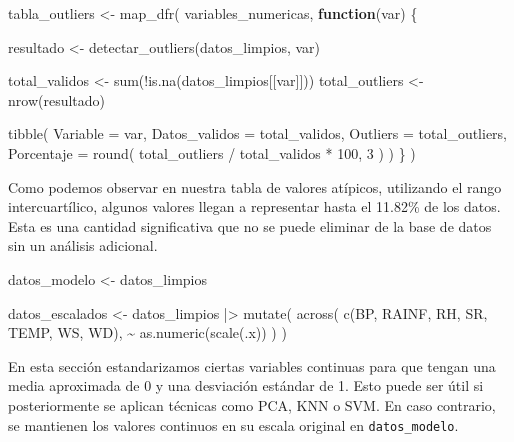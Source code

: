 \documentclass[
  letterpaper,
  DIV=11,
  numbers=noendperiod]{scrartcl}
\newenvironment{Shaded}{\begin{snugshade}}{\end{snugshade}}
\newcommand{\AttributeTok}[1]{\textcolor[rgb]{0.40,0.45,0.13}{#1}}
\newcommand{\ControlFlowTok}[1]{\textcolor[rgb]{0.00,0.23,0.31}{\textbf{#1}}}
\newcommand{\DecValTok}[1]{\textcolor[rgb]{0.68,0.00,0.00}{#1}}
\newcommand{\FunctionTok}[1]{\textcolor[rgb]{0.28,0.35,0.67}{#1}}
\newcommand{\NormalTok}[1]{\textcolor[rgb]{0.00,0.23,0.31}{#1}}
\newcommand{\OtherTok}[1]{\textcolor[rgb]{0.00,0.23,0.31}{#1}}
\newcommand{\SpecialCharTok}[1]{\textcolor[rgb]{0.37,0.37,0.37}{#1}}
\begin{document}
\begin{Shaded}
\begin{Highlighting}[]
\NormalTok{tabla\_outliers }\OtherTok{\textless{}{-}} \FunctionTok{map\_dfr}\NormalTok{(}
\NormalTok{  variables\_numericas,}
  \ControlFlowTok{function}\NormalTok{(var) \{}
    
\NormalTok{    resultado }\OtherTok{\textless{}{-}} \FunctionTok{detectar\_outliers}\NormalTok{(datos\_limpios, var)}
    
\NormalTok{    total\_validos }\OtherTok{\textless{}{-}} \FunctionTok{sum}\NormalTok{(}\SpecialCharTok{!}\FunctionTok{is.na}\NormalTok{(datos\_limpios[[var]]))}
\NormalTok{    total\_outliers }\OtherTok{\textless{}{-}} \FunctionTok{nrow}\NormalTok{(resultado)}
    
    \FunctionTok{tibble}\NormalTok{(}
      \AttributeTok{Variable =}\NormalTok{ var,}
      \AttributeTok{Datos\_validos =}\NormalTok{ total\_validos,}
      \AttributeTok{Outliers =}\NormalTok{ total\_outliers,}
      \AttributeTok{Porcentaje =} \FunctionTok{round}\NormalTok{(}
\NormalTok{        total\_outliers }\SpecialCharTok{/}\NormalTok{ total\_validos }\SpecialCharTok{*} \DecValTok{100}\NormalTok{,}
        \DecValTok{3}
\NormalTok{      )}
\NormalTok{    )}
\NormalTok{  \}}
\NormalTok{)}
\end{Highlighting}
\end{Shaded}

Como podemos observar en nuestra tabla de valores atípicos, utilizando
el rango intercuartílico, algunos valores llegan a representar hasta el
11.82\% de los datos. Esta es una cantidad significativa que no se puede
eliminar de la base de datos sin un análisis adicional.

\begin{Shaded}
\begin{Highlighting}[]
\NormalTok{datos\_modelo }\OtherTok{\textless{}{-}}\NormalTok{ datos\_limpios}

\NormalTok{datos\_escalados }\OtherTok{\textless{}{-}}\NormalTok{ datos\_limpios }\SpecialCharTok{|\textgreater{}}
  \FunctionTok{mutate}\NormalTok{(}
    \FunctionTok{across}\NormalTok{(}
      \FunctionTok{c}\NormalTok{(BP, RAINF, RH, SR, TEMP, WS, WD),}
      \SpecialCharTok{\textasciitilde{}} \FunctionTok{as.numeric}\NormalTok{(}\FunctionTok{scale}\NormalTok{(.x))}
\NormalTok{    )}
\NormalTok{  )}
\end{Highlighting}
\end{Shaded}

En esta sección estandarizamos ciertas variables continuas para que
tengan una media aproximada de 0 y una desviación estándar de 1. Esto
puede ser útil si posteriormente se aplican técnicas como PCA, KNN o
SVM. En caso contrario, se mantienen los valores continuos en su escala
original en \texttt{datos\_modelo}.
\end{document}
